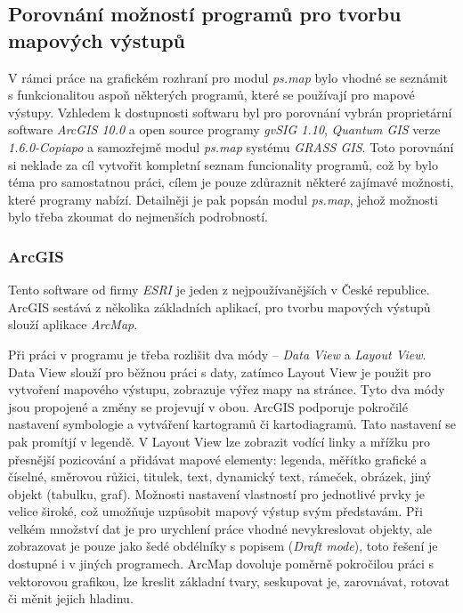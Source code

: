 \documentclass[a4paper,12pt,draft]{article}
\newcommand{\modul}[1]{\emph{#1}}
\begin{document}
\subsection{Porovnání možností programů pro tvorbu mapových výstupů}
V rámci práce na grafickém rozhraní pro modul \modul{ps.map} bylo
vhodné se seznámit s funkcionalitou aspoň některých programů, které
se používají pro mapové výstupy. Vzhledem k dostupnosti softwaru byl
pro porovnání vybrán proprietární software \emph{ArcGIS 10.0} a
open source programy \emph{gvSIG 1.10}, \emph{Quantum GIS} verze
\emph{1.6.0-Copiapo} a samozřejmě modul \modul{ps.map} systému \emph{GRASS
GIS}.
Toto porovnání si neklade za cíl vytvořit kompletní seznam
funcionality programů, což by bylo téma pro samostatnou práci,
cílem je pouze zdůraznit některé zajímavé možnosti, které programy
nabízí. Detailněji je pak popsán modul \modul{ps.map}, jehož možnosti
bylo třeba zkoumat do nejmenších podrobností.

\subsubsection{ArcGIS}
\label{sec:porovnani_moznosti:ArcGIS}
Tento software od firmy \emph{ESRI} je jeden z nejpoužívanějších v
České republice. ArcGIS sestává z několika základních aplikací,
pro tvorbu mapových výstupů slouží aplikace \emph{ArcMap}.

Při práci v programu je třeba rozlišit dva módy -- \emph{Data View}
a \emph{Layout View}. Data View slouží pro běžnou práci s daty,
zatímco Layout View je použit pro vytvoření mapového výstupu,
zobrazuje výřez mapy na stránce. Tyto dva módy jsou propojené a
změny se projevují v obou. ArcGIS podporuje pokročilé nastavení
symbologie a vytváření kartogramů či kartodiagramů. Tato nastavení se
pak promítjí v legendě. V Layout View lze zobrazit vodící linky a
mřížku pro přesnější pozicování  a  přidávat mapové elementy:
legenda, měřítko grafické a číselné, směrovou růžici, titulek,
text, dynamický text, rámeček, obrázek, jiný objekt (tabulku, graf).
Možnosti nastavení vlastností pro jednotlivé prvky je velice široké,
což umožňuje uzpůsobit mapový výstup svým představám. Při velkém
množství dat je pro urychlení práce vhodné nevykreslovat objekty, ale
zobrazovat je pouze jako šedé obdélníky s popisem (\emph{Draft mode}),
toto řešení je dostupné i v jiných programech. ArcMap dovoluje poměrně
pokročilou práci s vektorovou grafikou, lze kreslit základní tvary,
seskupovat je, zarovnávat, rotovat či měnit jejich hladinu.
\end{document}
